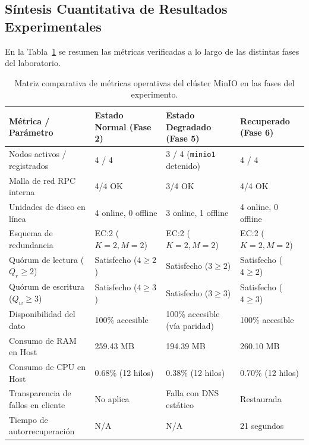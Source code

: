 \documentclass[12pt,a4paper]{article}
\begin{document}
\subsection{Síntesis Cuantitativa de Resultados Experimentales}
En la Tabla~\ref{tab:matriz_resultados} se resumen las métricas verificadas a lo largo de las distintas fases del laboratorio.

\begin{table}[H]
\centering\footnotesize
\caption{Matriz comparativa de métricas operativas del clúster MinIO en las fases del experimento.}
\begin{tabularx}{\linewidth}{@{}p{3.8cm}XXX@{}}
\toprule
\textbf{Métrica / Parámetro} & \textbf{Estado Normal (Fase 2)} & \textbf{Estado Degradado (Fase 5)} & \textbf{Recuperado (Fase 6)} \\
\midrule
Nodos activos / registrados & 4 / 4 & 3 / 4 (\texttt{minio1} detenido) & 4 / 4 \\
Malla de red RPC interna & 4/4 OK & 3/4 OK & 4/4 OK \\
Unidades de disco en línea & 4 online, 0 offline & 3 online, 1 offline & 4 online, 0 offline \\
Esquema de redundancia & EC:2 ($K=2, M=2$) & EC:2 ($K=2, M=2$) & EC:2 ($K=2, M=2$) \\
Quórum de lectura ($Q_r \ge 2$) & Satisfecho ($4 \ge 2$) & Satisfecho ($3 \ge 2$) & Satisfecho ($4 \ge 2$) \\
Quórum de escritura ($Q_w \ge 3$) & Satisfecho ($4 \ge 3$) & Satisfecho ($3 \ge 3$) & Satisfecho ($4 \ge 3$) \\
Disponibilidad del dato & 100\% accesible & 100\% accesible (vía paridad) & 100\% accesible \\
Consumo de RAM en Host & 259.43 MB & 194.39 MB & 260.10 MB \\
Consumo de CPU en Host & 0.68\% (12 hilos) & 0.38\% (12 hilos) & 0.70\% (12 hilos) \\
Transparencia de fallos en cliente & No aplica & Falla con DNS estático & Restaurada \\
Tiempo de autorrecuperación & N/A & N/A & 21 segundos \\
\bottomrule
\end{tabularx}
\label{tab:matriz_resultados}
\end{table}

\end{document}
